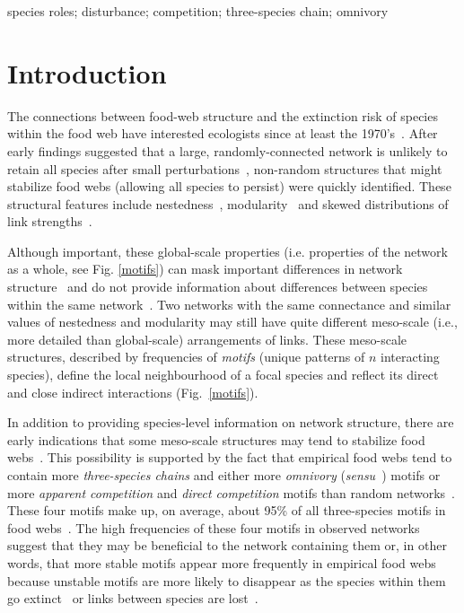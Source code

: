 \documentclass[12pt]{article}
\begin{document}
\begin{spacing}{2.0}
	species roles; disturbance; competition; three-species chain; omnivory

\clearpage
    
\section*{Introduction}

	The connections between food-web structure and the extinction risk of species within the food web have interested ecologists since at least the 1970's~\citep{May1972}. After early findings suggested that a large, randomly-connected network is unlikely to retain all species after small perturbations~\citep{Gardner1970,May1972}, non-random structures that might stabilize food webs (allowing all species to persist) were quickly identified. These structural features include nestedness~\citep{Allesina2012,Sauve2014}, modularity~\citep{Sauve2014,Thebault2010} and skewed distributions of link strengths~\citep{McCann1998,Gross2009,Rooney2012,Wootton2016}.
	
	
	Although important, these global-scale properties (i.e. properties of the network as a whole, see Fig. \ref{motifs}) can mask important differences in  network structure~\citep{Simmons2019} and do not provide information about differences between species within the same network~\citep{Cirtwill2018FoodWebs}. 
	Two networks with the same connectance and similar values of nestedness and modularity may still have quite different meso-scale (i.e., more detailed than global-scale) arrangements of links. 
	These meso-scale structures, described by frequencies of \emph{motifs} (unique patterns of $n$ interacting species), define the local neighbourhood of a focal species and reflect its direct and close indirect interactions (Fig.~\ref{motifs}).
	
	
    In addition to providing species-level information on network structure, there are early indications that some meso-scale structures may tend to stabilize food webs~\citep{Prill2005,Borrelli2015,Monteiro2016}. 
    This possibility is supported by the fact that empirical food webs tend to contain more \emph{three-species chains} and either more \emph{omnivory} (\emph{sensu}~\citealp[]{Thompson2007b}) motifs or more \emph{apparent competition} and \emph{direct competition} motifs than random networks~\citep{Stouffer2007}. 
    These four motifs make up, on average, about 95\% of all three-species motifs in food webs~\citep{Stouffer2010b}. 
    The high frequencies of these four motifs in observed networks suggest that they may be beneficial to the network containing them or, in other words, that more stable motifs appear more frequently in empirical food webs because unstable motifs are more likely to disappear as the species within them go extinct~\citep{Borrelli2015,Borrelli2015a} or links between species are lost~\citep{Tylianakis2010}.


\end{spacing}
\end{document}
